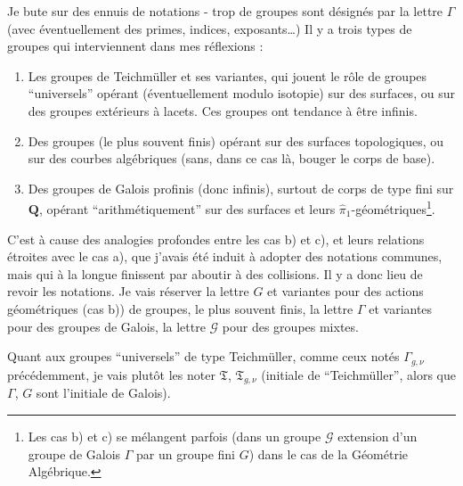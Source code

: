 Je bute sur des ennuis de notations - trop de groupes sont désignés par la lettre $\Gamma$ (avec éventuellement des primes, indices, exposants\dots) Il y a trois types de groupes qui interviennent dans mes réflexions :
\begin{enumerate}
    \item[a)] Les groupes de Teichmüller et ses variantes, qui jouent le rôle de groupes ``universels'' opérant (éventuellement modulo isotopie) sur des surfaces, ou sur des groupes extérieurs à lacets. Ces groupes ont tendance à être infinis.
    \item[b)] Des groupes (le plus souvent finis) opérant sur des surfaces topologiques, ou sur des courbes algébriques (sans, dans ce cas là, bouger le corps de base).
    \item[c)] Des groupes de Galois profinis (donc infinis), surtout de corps de type fini sur $\mathbf{Q}$, opérant ``arithmétiquement'' sur des surfaces et leurs $\widehat{\pi}_1$-géométriques\footnote{Les cas b) et c) se mélangent parfois (dans un groupe $\mathcal{G}$ extension d'un groupe de Galois $\Gamma$ par un groupe fini $G$) dans le cas de la Géométrie Algébrique.}.
\end{enumerate}

C'est à cause des analogies profondes entre les cas b) et c), et leurs relations étroites avec le cas a), que j'avais été induit à adopter des notations communes, mais qui à la longue finissent par aboutir à des collisions. Il y a donc lieu de revoir les notations. Je vais réserver la lettre $G$ et variantes pour des actions géométriques (cas b)) de groupes, le plus souvent finis, la lettre $\Gamma$ et variantes pour des groupes de Galois, la lettre $\mathcal{G}$ pour des groupes mixtes.

Quant aux groupes ``universels'' de type Teichmüller, comme ceux notés $\Gamma_{g, \nu}$ précédemment, je vais plutôt les noter $\mathfrak{T}$, $\mathfrak{T}_{g, \nu}$ (initiale de ``Teichmüller'', alors que $\Gamma$, $G$ sont l'initiale de Galois).

